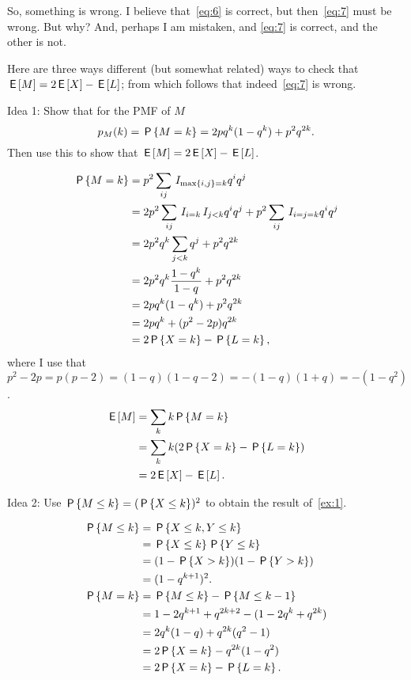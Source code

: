 \documentclass[a4paper,12pt]{article}
\begin{document}
So, something is wrong. I believe that~\cref{eq:6} is correct, but then~\cref{eq:7} must be wrong. But why? And, perhaps I am mistaken, and \cref{eq:7} is correct, and the other is not. 

Here are three ways different (but somewhat related) ways to check that $\E M = 2 \E X - \E L$; from which follows that indeed~\cref{eq:7} is wrong. 

\begin{exercise}\label{ex:1}
Idea 1: Show that for the PMF of $M$ 
\begin{equation}
  \label{eq:34}
p_M(k) = \P{M=k} = 2 pq^{k}(1-q^{k}) + p^2q^{2k}.
\end{equation}
Then use this to show that $\E M = 2\E X - \E L$.
\begin{solution}
  \begin{align}
    \label{eq:14}
\P{M=k}     
&=p^{2}\sum_{ij}\1{\max{i,j} =k} q^i q^j\\
&=2 p^{2}\sum_{ij}\1{i=k}\1{j < k} q^i q^j + p^{2}\sum_{ij}\1{i=j=k} q^{i} q^j \\
&=2 p^{2}q^{k}\sum_{j < k} q^j + p^{2}q^{2k}\\
&=2 p^{2}q^{k}\frac{1-q^{k}}{1-q} +  p^{2}q^{2k}\\
&=2 pq^{k}(1-q^{k}) + p^{2}q^{2k}\\
&=2 pq^{k} +(p^{2}-2p) q^{2k} \label{eq:18}\\
&=2 \P{X=k} - \P{L=k},
  \end{align}
where I use that $p^{2}-2p = p(p-2) = (1-q)(1-q-2)=-(1-q)(1+q)=-(1-q^{2})$.
  \begin{align}
    \label{eq:15}
\E M 
&= \sum_k k \P{M=k}     \\
&=  \sum_{k}k (2\P{X=k} - \P{L=k}) \\
&= 2 \E X  - \E L.
  \end{align}
\end{solution}
\end{exercise}

\begin{exercise}
Idea 2: Use  $\P{M\leq k} = (\P{X\leq k})^{2}$ to obtain the result of~\cref{ex:1}.
\begin{solution}
  \begin{align}
    \label{eq:16}
\P{M\leq k}   
&= \P{X\leq k, Y\leq k} \\
&= \P{X\leq k}\P{Y\leq k} \\
&= (1-\P{X> k})(1-\P{Y> k}) \\
&= (1-q^{k+1})^{2}.\\
\P{M=k} &= \P{M\leq k} - \P{M\leq k-1}\\
&= 1-2 q^{k+1} + q^{2k+2} - (1 - 2q^{k} + q^{2k})\\
&= 2 q^{k}(1-q) + q^{2k}(q^{2}-1) \\
&= 2 \P{X=k}  - q^{2k}(1-q^{2}) \\
&= 2 \P{X=k}  - \P{L=k}.
  \end{align}
\end{solution}
\end{exercise}
\end{document}
